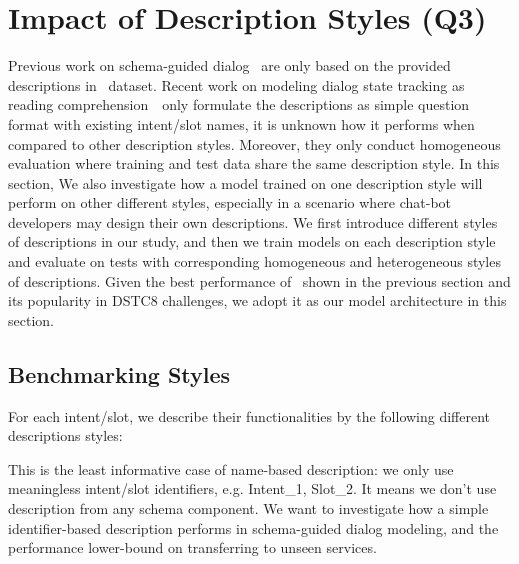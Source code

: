 \section{Impact of Description Styles (Q3)}
\label{sec:abl-desc}
Previous work on schema-guided dialog~\cite{rastogi2020schema} are
only based on the provided descriptions in \sgdst~dataset. Recent work
on modeling dialog state tracking as reading
comprehension~\cite{gao2019dialog}~only formulate the descriptions as
simple question format with existing intent/slot names, it is unknown
how it performs when compared to other description styles. Moreover,
they only conduct homogeneous evaluation where training and test data
share the same description style. In this section, We also investigate
how a model trained on one description style will perform on other
different styles, especially in a scenario where chat-bot developers
may design their own descriptions. We first introduce different styles
of descriptions in our study, and then we train models on each
description style and evaluate on tests with corresponding homogeneous
and heterogeneous styles of descriptions. Given the best performance
of \CE~shown in the previous section and its popularity in DSTC8
challenges, we adopt it as our model architecture in this section.

\subsection{Benchmarking Styles}
\label{ssec:desc-styles}
For each intent/slot, we describe their functionalities by the
following different descriptions styles:

\Paragraph{\ID} This is the least informative case of name-based
description: we only use meaningless intent/slot identifiers,
e.g. Intent\_1, Slot\_2. It means we don't use description from any
schema component. We want to investigate how a simple identifier-based
description performs in schema-guided dialog modeling, and the
performance lower-bound on transferring to unseen services.

